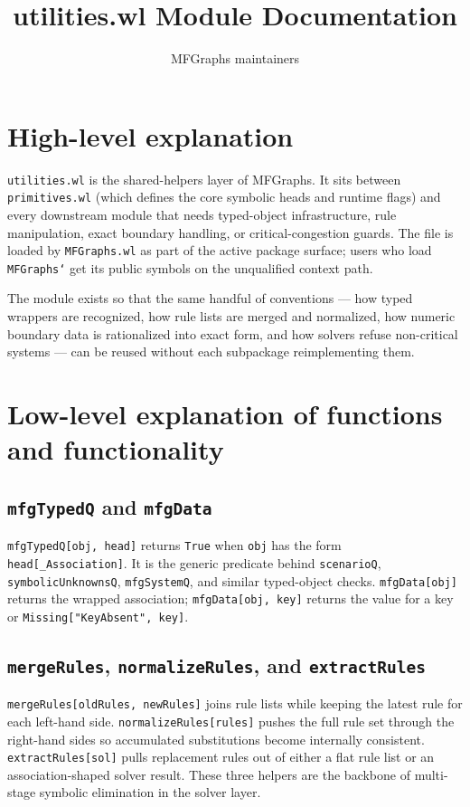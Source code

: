 \documentclass[11pt]{article}
\title{utilities.wl Module Documentation}
\author{MFGraphs maintainers}
\date{}
\begin{document}
\maketitle

\section{High-level explanation}

\texttt{utilities.wl} is the shared-helpers layer of MFGraphs. It sits between \texttt{primitives.wl} (which defines the core symbolic heads and runtime flags) and every downstream module that needs typed-object infrastructure, rule manipulation, exact boundary handling, or critical-congestion guards. The file is loaded by \texttt{MFGraphs.wl} as part of the active package surface; users who load \texttt{MFGraphs`} get its public symbols on the unqualified context path.

The module exists so that the same handful of conventions --- how typed wrappers are recognized, how rule lists are merged and normalized, how numeric boundary data is rationalized into exact form, and how solvers refuse non-critical systems --- can be reused without each subpackage reimplementing them.

\section{Low-level explanation of functions and functionality}

\subsection*{\texttt{mfgTypedQ} and \texttt{mfgData}}

\texttt{mfgTypedQ[obj, head]} returns \texttt{True} when \texttt{obj} has the form \texttt{head[\_Association]}. It is the generic predicate behind \texttt{scenarioQ}, \texttt{symbolicUnknownsQ}, \texttt{mfgSystemQ}, and similar typed-object checks. \texttt{mfgData[obj]} returns the wrapped association; \texttt{mfgData[obj, key]} returns the value for a key or \texttt{Missing["KeyAbsent", key]}.

\subsection*{\texttt{mergeRules}, \texttt{normalizeRules}, and \texttt{extractRules}}

\texttt{mergeRules[oldRules, newRules]} joins rule lists while keeping the latest rule for each left-hand side. \texttt{normalizeRules[rules]} pushes the full rule set through the right-hand sides so accumulated substitutions become internally consistent. \texttt{extractRules[sol]} pulls replacement rules out of either a flat rule list or an association-shaped solver result. These three helpers are the backbone of multi-stage symbolic elimination in the solver layer.
\end{document}
